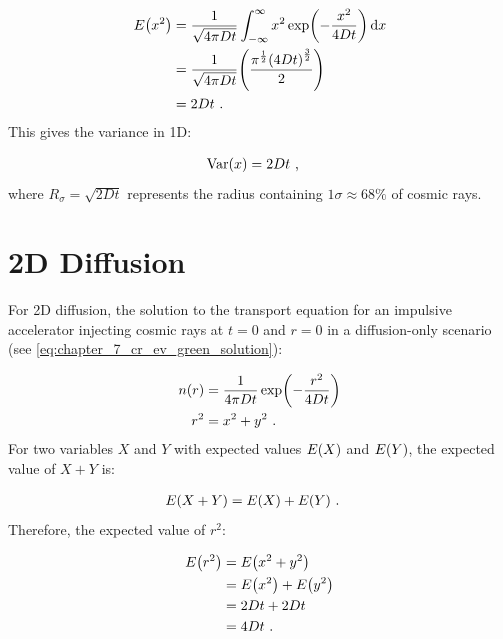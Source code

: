\begin{equation}
    \begin{aligned}
        E\qty(x^2)&=\frac{1}{\sqrt{4\pi Dt}}\int_{-\infty}^\infty x^2\exp(-\frac{x^2}{4Dt})\dd{x} \\
        &=\frac{1}{\sqrt{4\pi Dt}} \qty(\frac{\pi^\frac{1}{2} \qty(4Dt)^\frac{3}{2}}{2}) \\
        &=2Dt\text{ .} 
    \end{aligned}
\end{equation}
\noindent This gives the variance in 1D:

\begin{equation}
    \begin{aligned}
        \mathrm{Var}\qty(x)&=2Dt\text{ ,} 
    \end{aligned}
\end{equation}
\noindent where $R_\sigma=\sqrt{2Dt}$ represents the radius containing $1\sigma\approx 68\%$ of cosmic rays.

\section{2D Diffusion}

For 2D diffusion, the solution to the transport equation for an impulsive accelerator injecting cosmic rays at $t=0$ and $r=0$ in a diffusion-only scenario (see \autoref{eq:chapter_7_cr_ev_green_solution}):

\begin{equation}
    \begin{aligned}
        n\qty(r)&=\frac{1}{4\pi Dt}\exp(-\frac{r^2}{4Dt}) \\
        r^2&=x^2+y^2\text{ .} 
    \end{aligned}
\end{equation}
For two variables $X$ and $Y$ with expected values $E\qty(X)$ and $E\qty(Y)$, the expected value of $X+Y$ is:

\begin{equation}
    \begin{aligned}
        E\qty(X+Y)&=E\qty(X)+E\qty(Y)\text{ .} 
    \end{aligned}
\end{equation}
\noindent Therefore, the expected value of $r^2$:

\begin{equation}
    \begin{aligned}
        E\qty(r^2)&=E\qty(x^2+y^2) \\
        &=E\qty(x^2)+E\qty(y^2) \\
        &= 2Dt + 2Dt \\
        &=4Dt\text{ .} 
    \end{aligned}
\end{equation}

